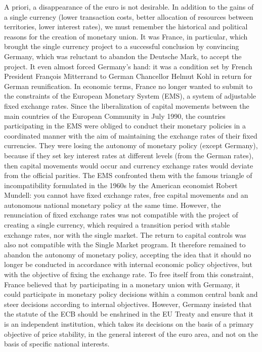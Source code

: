 \documentclass[12pt]{article}
\begin{document}
A priori, a disappearance of the euro is not desirable. In addition to the gains of a single currency (lower transaction costs, better allocation of resources between territories, lower interest rates), we must remember the historical and political reasons for the creation of monetary union. It was France, in particular, which brought the single currency project to a successful conclusion by convincing Germany, which was reluctant to abandon the Deutsche Mark, to accept the project. It even almost forced Germany's hand: it was a condition set by French President François Mitterrand to German Chancellor Helmut Kohl in return for German reunification. In economic terms, France no longer wanted to submit to the constraints of the European Monetary System (EMS), a system of adjustable fixed exchange rates. Since the liberalization of capital movements between the main countries of the European Community in July 1990, the countries participating in the EMS were obliged to conduct their monetary policies in a coordinated manner with the aim of maintaining the exchange rates of their fixed currencies. They were losing the autonomy of monetary policy (except Germany), because if they set key interest rates at different levels (from the German rates), then capital movements would occur and currency exchange rates would deviate from the official parities. 
The EMS confronted them with the famous triangle of incompatibility formulated in the 1960s by the American economist Robert Mundell: you cannot have fixed exchange rates, free capital movements and an autonomous national monetary policy at the same time. However, the renunciation of fixed exchange rates was not compatible with the project of creating a single currency, which required a transition period with stable exchange rates, nor with the single market. The return to capital controls was also not compatible with the Single Market program. It therefore remained to abandon the autonomy of monetary policy, accepting the idea that it should no longer be conducted in accordance with internal economic policy objectives, but with the objective of fixing the exchange rate. To free itself from this constraint, France believed that by participating in a monetary union with Germany, it could participate in monetary policy decisions within a common central bank and steer decisions according to internal objectives. However, Germany insisted that the statute of the ECB should be enshrined in the EU Treaty and ensure that it is an independent institution, which takes its decisions on the basis of a primary objective of price stability, in the general interest of the euro area, and not on the basis of specific national interests.
\end{document}
